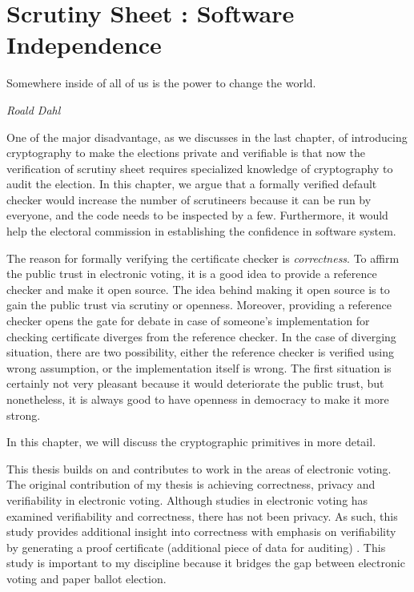\chapter{Scrutiny Sheet : Software Independence}
\label{cha:software_independence}

\epigraph{Somewhere inside of all of us is the power to change the world.} 
{\textit{Roald Dahl }}


One of the major disadvantage, as we discusses in the last chapter, of introducing cryptography to make the elections 
private and verifiable is that now the verification of scrutiny sheet requires specialized knowledge of cryptography
to audit the election.  In this chapter, we argue that a formally verified default checker would increase the number of scrutineers 
because it can be run by everyone, and the code needs to be inspected by a few. Furthermore, it would help the 
electoral commission in establishing  the confidence in software system.  

The reason for formally verifying  the certificate checker is \emph{correctness}. 
To affirm the public trust in electronic voting, it is a good idea to provide a reference 
checker and make it open source.  The idea behind making it open source is to gain the 
public trust  via scrutiny or openness.  Moreover, 
providing a reference checker opens the gate for debate in case of 
someone's implementation for checking certificate diverges from the reference checker.  
In the case of diverging situation, there are two possibility, either the reference checker is verified 
using wrong assumption,  or the implementation itself is wrong.  The first situation is certainly 
not very pleasant because it would deteriorate the public trust, but nonetheless, it is always good to 
have openness in democracy to make it more strong. 


In this chapter, we will discuss the cryptographic primitives in more detail. 

















This thesis builds on and contributes to work in the areas of electronic voting. 
The original contribution of my thesis is achieving correctness, privacy and verifiability in 
electronic voting. Although studies in electronic voting has examined verifiability and correctness, 
there has not been privacy.   As such, this study provides additional insight into correctness with 
emphasis on verifiability by generating a proof certificate (additional piece of data for auditing) . 
This study is important to my discipline because it bridges the gap between electronic voting 
and paper ballot election. 

